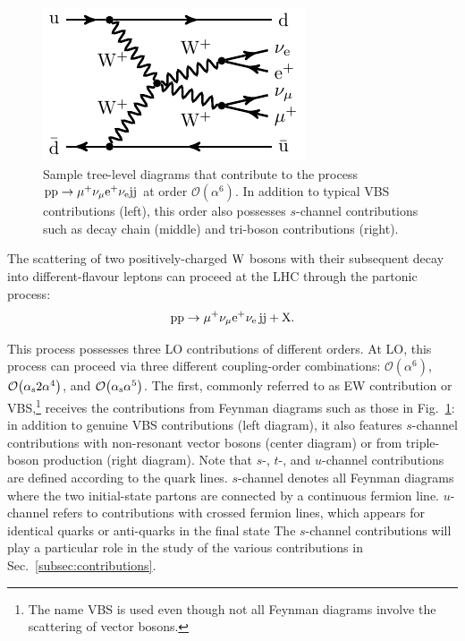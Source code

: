 \begin{figure}[t]
\begin{center}
          \includegraphics[width=0.30\linewidth]{feynman/LO_EW_5}
\end{center}
        \caption{Sample tree-level diagrams that contribute to the process $\text{p}\text{p}\to\mu^+\nu_\mu\text{e}^+\nu_{\text{e}}\text{j}\text{j}$ at order $\mathcal{O}{\left(\alpha^{6}\right)}$.
        In addition to typical VBS contributions (left), this order also possesses $s$-channel contributions such as decay chain (middle) and tri-boson contributions (right).}
\label{diag:LO}
\end{figure}

The scattering of two positively-charged $\text{W}$ bosons with their subsequent decay into different-flavour leptons 
can proceed at the LHC through the partonic process:
%
\begin{equation}
\text{p}\text{p}\to\mu^+\nu_\mu{\rm e}^+\nu_{\rm e}\,\text{j}\text{j}+\mathrm{X}.
\end{equation}

This process possesses three LO contributions of different orders.
At LO, this process can proceed via three different coupling-order combinations:
$\mathcal{O}{\left(\alpha^{6}\right)}$, $\mathcal{O}{\left(\alpha_\text{s}{2}\alpha^{4}\right)}$, and $\mathcal{O}{\left(\alpha_\text{s}\alpha^{5}\right)}$.
The first, commonly referred to as EW contribution or VBS,\footnote{The name VBS is used even though not all Feynman diagrams involve the scattering
of vector bosons.} receives the contributions from Feynman diagrams such as those in Fig.~\ref{diag:LO}:
in addition to genuine VBS contributions (left diagram), it also features $s$-channel contributions with non-resonant vector bosons 
(center diagram) or from
triple-boson production (right diagram).
Note that $s$-, $t$-, and $u$-channel contributions are defined according to the quark lines.
$s$-channel denotes all Feynman diagrams where the two initial-state partons are connected by a continuous fermion line.
$u$-channel refers to contributions with crossed fermion lines, which appears for identical quarks or anti-quarks in the final state
The $s$-channel contributions will play a particular role in the study of the various contributions in Sec.~\ref{subsec:contributions}.

